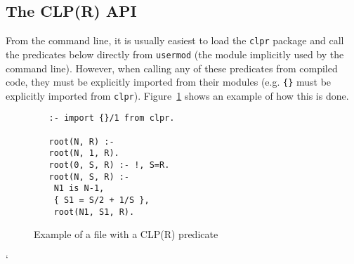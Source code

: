 \subsection{The CLP(R) API} \label{sec:clpr-api}
%
From the command line, it is usually easiest to load the {\tt clpr}
package and call the predicates below directly from {\tt usermod} (the
module implicitly used by the command line).  However, when calling
any of these predicates from compiled code, they must be explicitly
imported from their modules (e.g. {\tt \{\}} must be explicitly
imported from {\tt clpr}).  Figure~\ref{fig:clpr} shows an example of
how this is done.
%
\begin{figure} \label{fig:clpr}
{\small 
\begin{verbatim}
   :- import {}/1 from clpr.

   root(N, R) :-
   root(N, 1, R).
   root(0, S, R) :- !, S=R.
   root(N, S, R) :-
	N1 is N-1,
	{ S1 = S/2 + 1/S },
	root(N1, S1, R).
\end{verbatim}
}
\caption{Example of a file with a CLP(R) predicate}
\end{figure}
%
`
